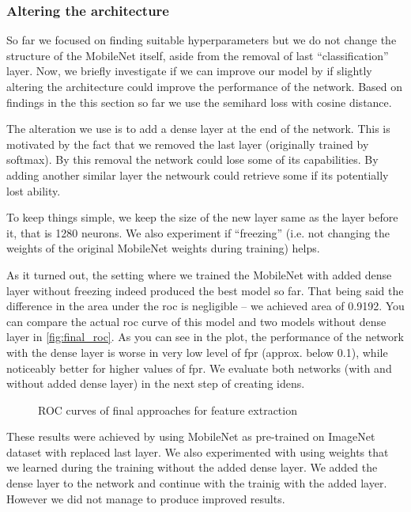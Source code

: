 \subsubsection{Altering the architecture}

So far we focused on finding suitable hyperparameters but we do not change the structure of the MobileNet itself, aside from the removal of last ``classification'' layer. Now, we briefly investigate if we can improve our model by if slightly altering the architecture could improve the performance of the network. Based on findings in the this section so far we use the semihard loss with cosine distance.

The alteration we use is to add a dense layer at the end of the network. This is motivated by the fact that we removed the last layer (originally trained by softmax). By this removal the network could lose some of its capabilities. By adding another similar layer the netwourk could retrieve some if its potentially lost ability. 

To keep things simple, we keep the size of the new layer same as the layer before it, that is 1280 neurons. We also experiment if ``freezing'' (i.e. not changing the weights of the original MobileNet weights during training) helps.

As it turned out, the setting where we trained the MobileNet with added dense layer without freezing indeed produced the best model so far. That being said the difference in the area under the \gls{roc} is negligible -- we achieved area of 0.9192. You can compare the actual \gls{roc} curve of this model and two models without dense layer in \autoref{fig:final_roc}. As you can see in the plot, the performance of the network with the dense layer is worse in very low level of \gls{fpr} (approx. below 0.1), while noticeably better for higher values of \gls{fpr}. We evaluate both networks (with and without added dense layer) in the next step of creating \glspl{iden}.


\begin{figure}
    \centering
    \def\svgwidth{\columnwidth}
    
    \caption{ROC curves of final approaches for feature extraction}
    \label{fig:final_roc}
\end{figure}

These results were achieved by using MobileNet as pre-trained on ImageNet dataset with replaced last layer. We also experimented with using weights that we learned during the training without the added dense layer. We added the dense layer to the network and continue with the trainig with the added layer. However we did not manage to produce improved results. 

